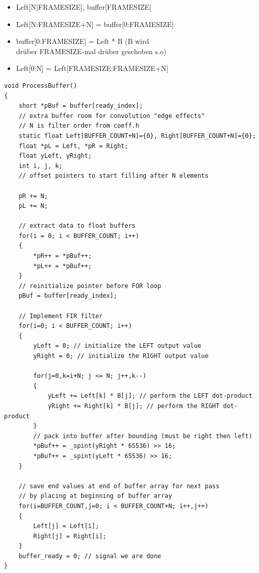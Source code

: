 \documentclass[10pt,a4paper]{article}
\begin{document}
\begin{itemize}
    \item Left[N|FRAMESIZE], buffer[FRAMESIZE]
    \item Left[N:FRAMESIZE+N] = buffer[0:FRAMESIZE]
    \item buffer[0:FRAMESIZE] = Left * B (B wird \\drüber FRAMESIZE-mal drüber geschoben s.o)
    \item Left[0:N] = Left[FRAMESIZE:FRAMESIZE+N]
\end{itemize}
\begin{verbatim}
void ProcessBuffer()
{
    short *pBuf = buffer[ready_index];
    // extra buffer room for convolution "edge effects"
    // N is filter order from coeff.h
    static float Left[BUFFER_COUNT+N]={0}, Right[BUFFER_COUNT+N]={0};
    float *pL = Left, *pR = Right;
    float yLeft, yRight;
    int i, j, k;
    // offset pointers to start filling after N elements

    pR += N;
    pL += N;

    // extract data to float buffers
    for(i = 0; i < BUFFER_COUNT; i++) 
    { 
        *pR++ = *pBuf++;
        *pL++ = *pBuf++;
    }
    // reinitialize pointer before FOR loop
    pBuf = buffer[ready_index];

    // Implement FIR filter
    for(i=0; i < BUFFER_COUNT; i++) 
    {
        yLeft = 0; // initialize the LEFT output value
        yRight = 0; // initialize the RIGHT output value

        for(j=0,k=i+N; j <= N; j++,k--) 
        {
            yLeft += Left[k] * B[j]; // perform the LEFT dot-product
            yRight += Right[k] * B[j]; // perform the RIGHT dot-product
        }
        // pack into buffer after bounding (must be right then left)
        *pBuf++ = _spint(yRight * 65536) >> 16;
        *pBuf++ = _spint(yLeft * 65536) >> 16;
    }

    // save end values at end of buffer array for next pass
    // by placing at beginning of buffer array
    for(i=BUFFER_COUNT,j=0; i < BUFFER_COUNT+N; i++,j++) 
    {
        Left[j] = Left[i];
        Right[j] = Right[i];
    }
    buffer_ready = 0; // signal we are done
}
\end{verbatim}

\end{document}
